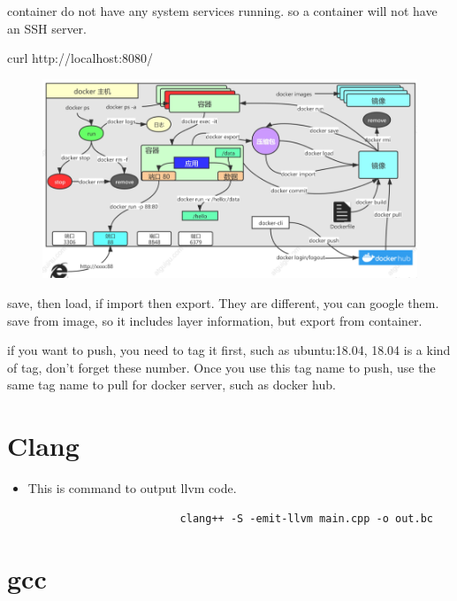 \documentclass[a4paper,11pt,twoside]{book}
\begin{document}
container do not have any system services running. so a container will not have an SSH server.

curl http://localhost:8080/

\begin{figure}
	\centering
	\includegraphics[width=0.7\linewidth]{pics/docker}
	\caption{}
	\label{fig:docker}
\end{figure}

save, then load,  if import then export. They are different, you can google them.
save from image, so it includes layer information, but export from container. 

if you want to push, you need to tag it first,  such as ubuntu:18.04,  18.04 is a kind of tag, don't forget these number.  Once you use this tag name to push, use the same tag name to pull for docker server, such as docker hub. 



\section{Clang}

\begin{itemize}
		\item This is command to output llvm code.
				\begin{lstlisting}
						clang++ -S -emit-llvm main.cpp -o out.bc
				\end{lstlisting}
\end{itemize}

\section{gcc}
\end{document}
